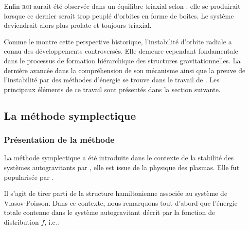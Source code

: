 Enfin \textsc{roi} aurait été observée dans un équilibre triaxial selon \cite{antonini}: elle se produirait lorsque ce dernier serait trop peuplé
d'orbites en forme de boites. Le système deviendrait alors plus prolate et toujours triaxial.

Comme le montre cette perspective historique, l'instabilité d'orbite radiale a connu des développements controversés. Elle demeure cependant
fondamentale dans le processus de formation hiérarchique des structures gravitationnelles. La dernière avancée dans la compréhension de son mécanisme
ainsi que la preuve de l'instabilité par des méthodes d'énergie se trouve dans le travail de \cite{future}. Les principaux éléments
de ce travail sont présentés dans la section suivante.

\subsection{La méthode symplectique}

\subsubsection{Présentation de la méthode}

La méthode symplectique a été introduite dans le contexte de la stabilité des systèmes autogravitants par \cite{bartho}, elle est issue de
la physique des plasmas. Elle fut popularisée par \cite{kandrupstability}.

Il s'agit de tirer parti de la structure hamiltonienne associée au système de Vlasov-Poisson. Dans ce contexte, nous remarquons tout d'abord que
l'énergie totale contenue dans le système autogravitant décrit par la fonction de distribution $f$, i.e.:

